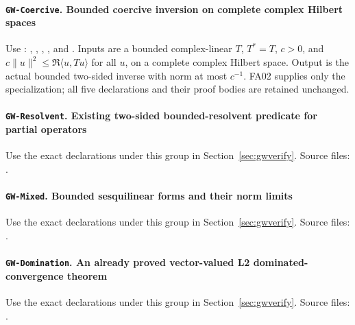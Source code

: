 \documentclass[11pt,a4paper]{article}
\theoremstyle{remark}\newtheorem{remark}[theorem]{Remark}
\begin{document}
\paragraph{\texttt{GW-Coercive}. Bounded coercive inversion on complete complex Hilbert spaces}\label{leaf:GW-Coercive}
Use : , , , , and . Inputs are a bounded complex-linear $T$, $T^*=T$, $c>0$, and $c\|u\|^2\leq\Re\langle u,Tu\rangle$ for all $u$, on a complete complex Hilbert space. Output is the actual bounded two-sided inverse with norm at most $c^{-1}$. FA02 supplies only the specialization; all five declarations and their proof bodies are retained unchanged.
\paragraph{\texttt{GW-Resolvent}. Existing two-sided bounded-resolvent predicate for partial operators}\label{leaf:GW-Resolvent}
Use the exact declarations under this group in Section~\ref{sec:gwverify}. Source files: .
\paragraph{\texttt{GW-Mixed}. Bounded sesquilinear forms and their norm limits}\label{leaf:GW-Mixed}
Use the exact declarations under this group in Section~\ref{sec:gwverify}. Source files: .
\paragraph{\texttt{GW-Domination}. An already proved vector-valued L2 dominated-convergence theorem}\label{leaf:GW-Domination}
Use the exact declarations under this group in Section~\ref{sec:gwverify}. Source files: .
\end{document}
